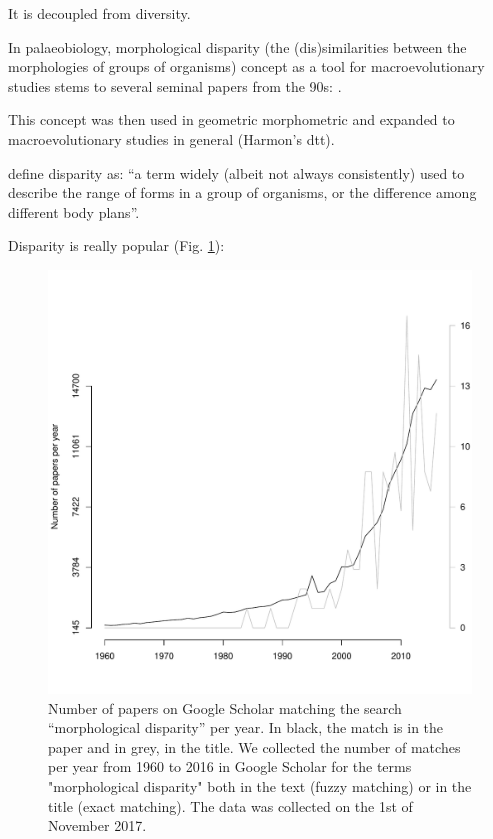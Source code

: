\documentclass[12pt,letterpaper]{article}
\begin{document}
It is decoupled from diversity.

\bigskip

In palaeobiology, morphological disparity (the (dis)similarities between the morphologies of groups of organisms) concept as a tool for macroevolutionary studies stems to several seminal papers from the 90s: \cite{gould1989wonderful,gould1991disparity,briggs1992morphological,Wills1994,Foote01071994,Foote29111996,jernvall1996molar,foote1997evolution}.

This concept was then used in geometric morphometric and expanded to macroevolutionary studies in general (Harmon's dtt).

\cite{prentice2011} define disparity as: ``a term widely (albeit not always consistently) used to describe the range of forms in a group of organisms, or the difference among different body plans''.

\bigskip


Disparity is really popular (Fig. \ref{Fig:GoogleOccurences}):

\begin{figure}[!htbp]
\centering
   \includegraphics[width=1\textwidth]{Figures/GoogleScholarOccurences.pdf} 
\caption{Number of papers on Google Scholar matching the search ``morphological disparity'' per year. In black, the match is in the paper and in grey, in the title. We collected the number of matches per year from 1960 to 2016 in Google Scholar for the terms "morphological disparity" both in the text (fuzzy matching) or in the title (exact matching). The data was collected on the 1st of November 2017.}
\label{Fig:GoogleOccurences}
\end{figure}
\end{document}

